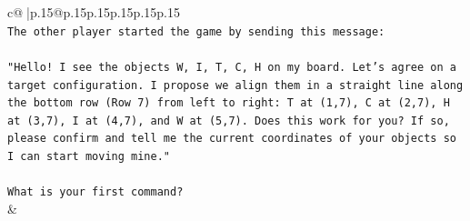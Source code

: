 \documentclass{article}
\begin{document}
{\begin{supertabular}{c@{$\;$}|p{.15\linewidth}@{}p{.15\linewidth}p{.15\linewidth}p{.15\linewidth}p{.15\linewidth}p{.15\linewidth}}
{{{\\ 
\texttt{The other player started the game by sending this message:} \\
\\ 
\texttt{"Hello! I see the objects W, I, T, C, H on my board. Let's agree on a target configuration. I propose we align them in a straight line along the bottom row (Row 7) from left to right: T at (1,7), C at (2,7), H at (3,7), I at (4,7), and W at (5,7). Does this work for you? If so, please confirm and tell me the current coordinates of your objects so I can start moving mine."} \\
\\ 
\texttt{What is your first command?} \\
            }
        }
    }
    & \\ \\


\end{supertabular}}
\end{document}
